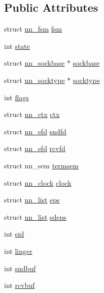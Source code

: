 \subsection*{Public Attributes}
\begin{DoxyCompactItemize}
\item 
struct \hyperlink{structnn__fsm}{nn\+\_\+fsm} \hyperlink{structnn__sock_a4442a9828289f996a21c094801e87812}{fsm}
\item 
int \hyperlink{structnn__sock_a481cb8fb955527fd926e1e1c0a199be4}{state}
\item 
struct \hyperlink{structnn__sockbase}{nn\+\_\+sockbase} $\ast$ \hyperlink{structnn__sock_ab1d8048bec771175fa1b0a8ed5decbdd}{sockbase}
\item 
struct \hyperlink{structnn__socktype}{nn\+\_\+socktype} $\ast$ \hyperlink{structnn__sock_a51d244f07a571239c580623b685e07de}{socktype}
\item 
int \hyperlink{structnn__sock_ab4a146b813c91c7234062d23fac43cd9}{flags}
\item 
struct \hyperlink{structnn__ctx}{nn\+\_\+ctx} \hyperlink{structnn__sock_a821ca6b63730e1d30db13c0ab054588e}{ctx}
\item 
struct \hyperlink{structnn__efd}{nn\+\_\+efd} \hyperlink{structnn__sock_a930407ad2875a68877dcd5b55d5e1ea2}{sndfd}
\item 
struct \hyperlink{structnn__efd}{nn\+\_\+efd} \hyperlink{structnn__sock_a9fb47bafd675b79dd39e99a19e1adb53}{rcvfd}
\item 
struct nn\+\_\+sem \hyperlink{structnn__sock_a899d6cc7b10998e4e4979558dabd5c0d}{termsem}
\item 
struct \hyperlink{structnn__clock}{nn\+\_\+clock} \hyperlink{structnn__sock_afcf535ba063d881790951b6047850335}{clock}
\item 
struct \hyperlink{structnn__list}{nn\+\_\+list} \hyperlink{structnn__sock_aef79aa48a975a08a67e1735bf8102867}{eps}
\item 
struct \hyperlink{structnn__list}{nn\+\_\+list} \hyperlink{structnn__sock_a49da324c86816f1c9fc0218d9d9f20af}{sdeps}
\item 
int \hyperlink{structnn__sock_a9560a8b4ac91cb913d2b914240e09ad9}{eid}
\item 
int \hyperlink{structnn__sock_ad5cbf262759008ddd3fe228d643249c5}{linger}
\item 
int \hyperlink{structnn__sock_a22dd6b6e44efa831bc64816e30abec1e}{sndbuf}
\item 
int \hyperlink{structnn__sock_a1864e5e6fa7ee8a5315dd56d3637a002}{rcvbuf}

\end{DoxyCompactItemize}
